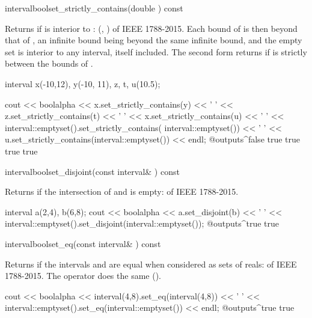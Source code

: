 \begin{defmethod}{interval}{bool}{set\_strictly\_contains}{(double ) const}
  \begin{operation}
  \end{operation}
  Returns  if  is interior to :
  (, ) of IEEE 1788-2015. Each bound of
   is then beyond that of , an infinite bound being beyond
  the same infinite bound, and the empty set is interior to any interval,
  itself included.\newinvfive{} The second form returns  if
   is strictly between the bounds of .

\begin{example}
interval x(-10,12), y(-10, 11), z, t, u(10.5);

cout << boolalpha
     << x.set_strictly_contains(y) << ' '
     << z.set_strictly_contains(t) << ' '
     << x.set_strictly_contains(u) << ' '
     << interval::emptyset().set_strictly_contains(
                                 interval::emptyset()) << ' '
     << u.set_strictly_contains(interval::emptyset())
     << endl;
@outputs^false true true true true~
\end{example}
\end{defmethod}

\begin{defmethod}{interval}{bool}{set\_disjoint}{(const interval\& ) const}
  \begin{operation}
  \end{operation}
  Returns  if the intersection of  and  is
  empty:  of IEEE 1788-2015.

\begin{example}
interval a(2,4), b(6,8);
cout << boolalpha << a.set_disjoint(b) << ' '
     << interval::emptyset().set_disjoint(interval::emptyset());
@outputs^true true~
\end{example}
\end{defmethod}

\begin{defmethod}{interval}{bool}{set\_eq}{(const interval\& ) const}
  \begin{operation}
  \end{operation}
  Returns  if the intervals  and  are equal
  when considered as sets of reals:  of IEEE 1788-2015. The
  operator \code{==} does the same ().\newinvfive
\begin{example}
cout << boolalpha << interval(4,8).set_eq(interval(4,8)) << ' '
     << interval::emptyset().set_eq(interval::emptyset()) << endl;
@outputs^true true~
\end{example}
\end{defmethod}

